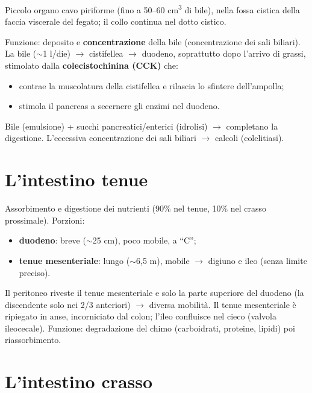 Piccolo organo cavo piriforme (fino a 50--60 cm\textsuperscript{3} di bile), nella fossa cistica della
faccia viscerale del fegato; il collo continua nel dotto cistico.

Funzione: deposito e \textbf{concentrazione} della bile (concentrazione dei sali biliari). La bile
($\sim$1 l/die) $\rightarrow$ cistifellea $\rightarrow$ duodeno, soprattutto dopo l'arrivo di grassi,
stimolato dalla \textbf{colecistochinina (CCK)} che:
\begin{itemize}
  \item contrae la muscolatura della cistifellea e rilascia lo sfintere dell'ampolla;
  \item stimola il pancreas a secernere gli enzimi nel duodeno.
\end{itemize}
Bile (emulsione) + succhi pancreatici/enterici (idrolisi) $\rightarrow$ completano la digestione.
L'eccessiva concentrazione dei sali biliari $\rightarrow$ calcoli (colelitiasi).

\section{L'intestino tenue}

Assorbimento e digestione dei nutrienti (90\% nel tenue, 10\% nel crasso prossimale). Porzioni:
\begin{itemize}
  \item \textbf{duodeno}: breve ($\sim$25 cm), poco mobile, a ``C'';
  \item \textbf{tenue mesenteriale}: lungo ($\sim$6,5 m), mobile $\rightarrow$ digiuno e ileo (senza
    limite preciso).
\end{itemize}
Il peritoneo riveste il tenue mesenteriale e solo la parte superiore del duodeno (la discendente solo
nei 2/3 anteriori) $\rightarrow$ diversa mobilità. Il tenue mesenteriale è ripiegato in anse,
incorniciato dal colon; l'ileo confluisce nel cieco (valvola ileocecale). Funzione: degradazione del
chimo (carboidrati, proteine, lipidi) poi riassorbimento.

\section{L'intestino crasso}

